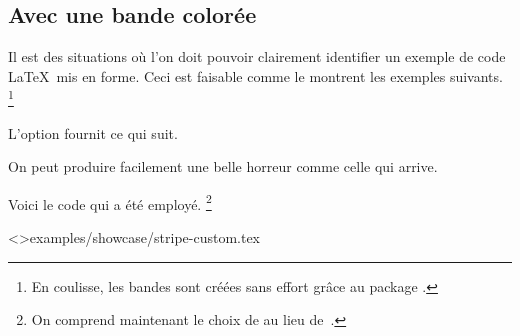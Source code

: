 \documentclass{tutodoc}
\begin{document}
\subsection{Avec une bande colorée}

Il est des situations où l'on doit pouvoir clairement identifier un exemple de code \LaTeX\ mis en forme. Ceci est faisable comme le montrent les exemples suivants.%
\footnote{
    En coulisse, les bandes sont créées sans effort grâce au package .
}


\begin{tdocexa}
	L'option  fournit ce qui suit.

	
\end{tdocexa}


\begin{tdocexa}
	On peut produire facilement une belle horreur comme celle qui arrive.

	

	Voici le code qui a été employé.%
	\footnote{
		On comprend maintenant le choix de  au lieu de \,.
	}

	\tdoclatexinput<>{examples/showcase/stripe-custom.tex}
\end{tdocexa}
\end{document}
